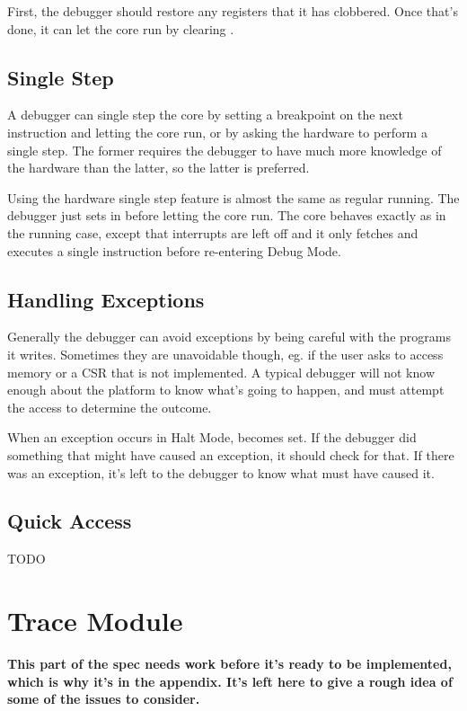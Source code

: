 \documentclass{article}
\begin{document}
First, the debugger should restore any registers that it has clobbered.  Once
that's done, it can let the core run by clearing \Fhalt.

\subsection{Single Step}

A debugger can single step the core by setting a breakpoint on the next
instruction and letting the core run, or by asking the hardware to perform a
single step. The former requires the debugger to have much more knowledge of
the hardware than the latter, so the latter is preferred.

Using the hardware single step feature is almost the same as regular running.
The debugger just sets \Fstep in \Rdcsr before letting the core run. The core
behaves exactly as in the running case, except that interrupts are left off and
it only fetches and executes a single instruction before re-entering Debug
Mode.

\subsection{Handling Exceptions}

Generally the debugger can avoid exceptions by being careful with the programs
it writes. Sometimes they are unavoidable though, eg. if the user asks to
access memory or a CSR that is not implemented. A typical debugger will not
know enough about the platform to know what's going to happen, and must attempt
the access to determine the outcome.

When an exception occurs in Halt Mode, \Fhmexc becomes set. If the debugger did
something that might have caused an exception, it should check for that. If
there was an exception, it's left to the debugger to know what must have caused
it.

\subsection{Quick Access} \label{quickaccess}

TODO

\section{Trace Module}

{\bf This part of the spec needs work before it's ready to be implemented,
which is why it's in the appendix. It's left here to give a rough idea of some
of the issues to consider.}
\end{document}
